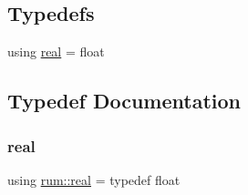 \subsection*{Typedefs}
\begin{DoxyCompactItemize}
\item 
using \hyperlink{namespacerum_a7e8cca23573d5eaead0f138cbaa4862c}{real} = float
\end{DoxyCompactItemize}


\subsection{Typedef Documentation}
\mbox{\label{namespacerum_a7e8cca23573d5eaead0f138cbaa4862c}} 
\subsubsection{\texorpdfstring{real}{real}}
{\footnotesize\ttfamily using \hyperlink{namespacerum_a7e8cca23573d5eaead0f138cbaa4862c}{rum\+::real} = typedef float}

